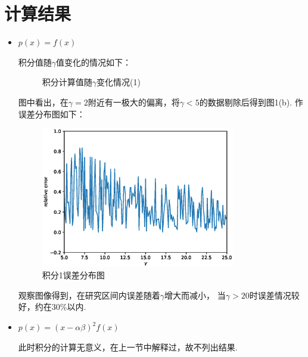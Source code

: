 \documentclass[12pt,a4paper,utf8]{ctexart}
\begin{document}
\section{计算结果}
\begin{itemize}
    \item $p(x) = f(x)$

        积分值随$\gamma$值变化的情况如下：
        \begin{figure}[h]
            \centering
            \hfill
            \caption{积分计算值随$\gamma$变化情况(1)}
        \end{figure}

        图中看出，在$\gamma=2$附近有一极大的偏离，将$\gamma<5$的数据剔除后得到图1(b).
        作误差分布图如下：

        \begin{figure}[!h]
            \centering
            \includegraphics[width=0.8\textwidth]{error1.eps}
            \caption{积分1误差分布图}
        \end{figure}

        观察图像得到，在研究区间内误差随着$\gamma$增大而减小，
        当$\gamma > 20$时误差情况较好，约在$30\%$以内.
    \item $p(x) = (x-\alpha \beta)^2 f(x)$

        此时积分的计算无意义，在上一节中解释过，故不列出结果.
\end{itemize}
\end{document}
